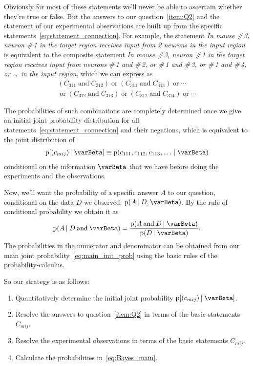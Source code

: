 \documentclass[\ifafour a4paper,12pt,\else a5paper,10pt,\fi%
onecolumn,oneside,article,%
british%
]{memoir}
\theoremstyle{remark}
\theoremstyle{innote}
\newcommand*{\pf}{\mathrm{p}}%
\renewcommand*{\|}[1][]{\nonscript\,#1\vert\nonscript\;\mathopen{}}
\newcommand*{\yI}{\varBeta}
\newcommand*{\yC}{C}
\newcommand*{\yc}{c}
\newcommand*{\statm}[1]{\textsl{\textsf{#1}}}
\begin{document}
Obviously for most of these statements we'll never be able to ascertain
whether they're true or false. But the answers to our
question~\ref{item:Q2} and the statement of our experimental observations
are built up from the specific statements~\eqref{eq:statement_connection}.
For example, the statement \statm{In mouse \#\,3, neuron \#\,1 in the
  target region receives input from 2 neurons in the input region} is
equivalent to the composite statement \statm{In mouse \#\,3, neuron \#\,1
  in the target region receives input from neurons \#\,1 and \#\,2, or
  \#\,1 and \#\,3, or \#\,1 and \#\,4, or \ldots\ in the input region},
which we can express as
\begin{multline}
  (\yC_{311} \mathbin{\text{and}} \yC_{312}) \mathbin{\text{or}}
  (\yC_{311} \mathbin{\text{and}} \yC_{313}) \mathbin{\text{or}}
  \dotsb{}\\ {}\mathbin{\text{or}}
  (\yC_{312} \mathbin{\text{and}} \yC_{313}) \mathbin{\text{or}}
  (\yC_{312} \mathbin{\text{and}} \yC_{314}) \mathbin{\text{or}}
  \dotsb{}
\end{multline}

The probabilities of such combinations are completely determined once we
give an initial joint probability distribution for all
statements~\eqref{eq:statement_connection} and their negations, which is
equivalent to the joint distribution of 
\begin{equation}
  \pf[(\yc_{mij}) \| \yI] \equiv
  \pf(\yc_{111}, \yc_{112},\yc_{113},\dotsc \| \yI)
  \label{eq:main_init_prob}
\end{equation}
conditional on the information $\yI$ that we have before doing the
experiments and the observations.

Now, we'll want the probability of a specific answer $A$ to our question,
conditional on the data $D$ we observed: $\pf(A \| D,\yI)$. By the rule of
conditional probability we obtain it as
\begin{equation}
  \label{eq:Bayes_main}
  \pf(A \| D \mathbin{\text{and}} \yI) =
\frac{\pf(A \mathbin{\text{and}} D \| \yI)}{\pf(D \| \yI)}.
\end{equation}
The probabilities in the  numerator and denominator can be obtained from
our main joint probability~\eqref{eq:main_init_prob} using the basic rules
of the probability-calculus.

\medskip

So our strategy is as follows:
\begin{enumerate}
\item Quantitatively determine the initial joint probability
  $\pf[(\yc_{mij}) \| \yI]$.
\item Resolve the answers to question~\ref{item:Q2} in terms of the basic
  statements $\yC_{mij}$.
\item Resolve the experimental observations in terms of the basic
  statements $\yC_{mij}$.
\item Calculate the probabilities in~\eqref{eq:Bayes_main}.
\end{enumerate}
\end{document}
